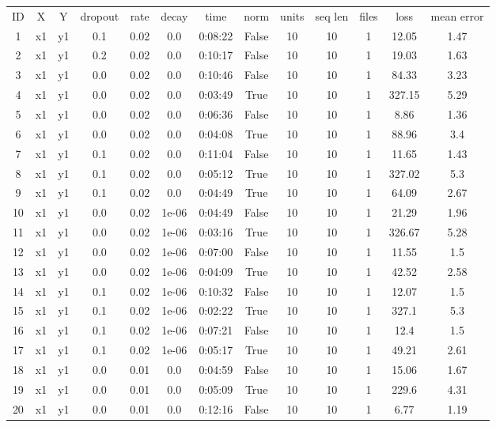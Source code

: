 \begin{longtable}{c | c | c | c | c | c | c | c | c | c | c | c | c}
ID & X & Y & dropout & rate & decay & time & norm & units & seq len & files & loss & mean error \\
1 & x1 & y1 & 0.1 & 0.02 & 0.0 & 0:08:22 & False & 10 & 10 & 1 & 12.05 & 1.47 \\
2 & x1 & y1 & 0.2 & 0.02 & 0.0 & 0:10:17 & False & 10 & 10 & 1 & 19.03 & 1.63 \\
3 & x1 & y1 & 0.0 & 0.02 & 0.0 & 0:10:46 & False & 10 & 10 & 1 & 84.33 & 3.23 \\
4 & x1 & y1 & 0.0 & 0.02 & 0.0 & 0:03:49 & True & 10 & 10 & 1 & 327.15 & 5.29 \\
5 & x1 & y1 & 0.0 & 0.02 & 0.0 & 0:06:36 & False & 10 & 10 & 1 & 8.86 & 1.36 \\
6 & x1 & y1 & 0.0 & 0.02 & 0.0 & 0:04:08 & True & 10 & 10 & 1 & 88.96 & 3.4 \\
7 & x1 & y1 & 0.1 & 0.02 & 0.0 & 0:11:04 & False & 10 & 10 & 1 & 11.65 & 1.43 \\
8 & x1 & y1 & 0.1 & 0.02 & 0.0 & 0:05:12 & True & 10 & 10 & 1 & 327.02 & 5.3 \\
9 & x1 & y1 & 0.1 & 0.02 & 0.0 & 0:04:49 & True & 10 & 10 & 1 & 64.09 & 2.67 \\
10 & x1 & y1 & 0.0 & 0.02 & 1e-06 & 0:04:49 & False & 10 & 10 & 1 & 21.29 & 1.96 \\
11 & x1 & y1 & 0.0 & 0.02 & 1e-06 & 0:03:16 & True & 10 & 10 & 1 & 326.67 & 5.28 \\
12 & x1 & y1 & 0.0 & 0.02 & 1e-06 & 0:07:00 & False & 10 & 10 & 1 & 11.55 & 1.5 \\
13 & x1 & y1 & 0.0 & 0.02 & 1e-06 & 0:04:09 & True & 10 & 10 & 1 & 42.52 & 2.58 \\
14 & x1 & y1 & 0.1 & 0.02 & 1e-06 & 0:10:32 & False & 10 & 10 & 1 & 12.07 & 1.5 \\
15 & x1 & y1 & 0.1 & 0.02 & 1e-06 & 0:02:22 & True & 10 & 10 & 1 & 327.1 & 5.3 \\
16 & x1 & y1 & 0.1 & 0.02 & 1e-06 & 0:07:21 & False & 10 & 10 & 1 & 12.4 & 1.5 \\
17 & x1 & y1 & 0.1 & 0.02 & 1e-06 & 0:05:17 & True & 10 & 10 & 1 & 49.21 & 2.61 \\
18 & x1 & y1 & 0.0 & 0.01 & 0.0 & 0:04:59 & False & 10 & 10 & 1 & 15.06 & 1.67 \\
19 & x1 & y1 & 0.0 & 0.01 & 0.0 & 0:05:09 & True & 10 & 10 & 1 & 229.6 & 4.31 \\
20 & x1 & y1 & 0.0 & 0.01 & 0.0 & 0:12:16 & False & 10 & 10 & 1 & 6.77 & 1.19 \\

\end{longtable}
